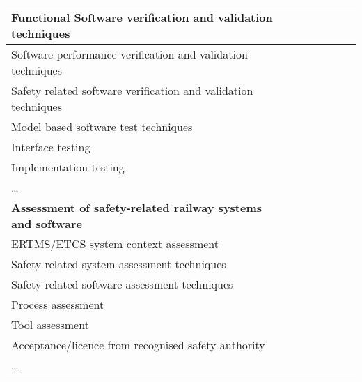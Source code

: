 \documentclass[a4paper, 11pt]{article}
\begin{document}
\begin{center}
\begin{longtable}{|r|r|r|r|r|r|r|r|}
    \multicolumn{1}{|l|}{Functional Software verification and validation techniques} & \multicolumn{1}{l|}{} &       &       &       &       &       &  \bigstrut[b]\\
    \hline
    \multicolumn{1}{|l|}{Software performance verification and validation techniques} & \multicolumn{1}{l|}{} &       &       &       &       &       &  \bigstrut\\
    \hline
    \multicolumn{1}{|l|}{Safety related software verification and validation techniques} & \multicolumn{1}{l|}{} &       &       &       &       &       &  \bigstrut\\
    \hline
    \multicolumn{1}{|l|}{Model based software test techniques } & \multicolumn{1}{l|}{} &       &       &       &       &       &  \bigstrut\\
    \hline
    \multicolumn{1}{|l|}{Interface testing} & \multicolumn{1}{l|}{} &       &       &       &       &       &  \bigstrut\\
    \hline
    \multicolumn{1}{|l|}{Implementation testing} & \multicolumn{1}{l|}{} &       &       &       &       &       &  \bigstrut\\
    \hline
    \multicolumn{1}{|l|}{…} & \multicolumn{1}{l|}{} &       &       &       &       &       &  \bigstrut[t]\\
    \multicolumn{1}{|l|}{\textbf{Assessment of safety-related railway systems and software}} & \multicolumn{1}{l|}{\textbf{}} &       &       &       &       &       &  \\
    \multicolumn{1}{|l|}{ERTMS/ETCS system context assessment} & \multicolumn{1}{l|}{} &       &       &       &       &       &  \bigstrut[b]\\
    \hline
    \multicolumn{1}{|l|}{Safety related system assessment techniques} & \multicolumn{1}{l|}{} &       &       &       &       &       &  \bigstrut\\
    \hline
    \multicolumn{1}{|l|}{Safety related software assessment techniques} & \multicolumn{1}{l|}{} &       &       &       &       &       &  \bigstrut\\
    \hline
    \multicolumn{1}{|l|}{Process assessment} & \multicolumn{1}{l|}{} &       &       &       &       &       &  \bigstrut\\
    \hline
    \multicolumn{1}{|l|}{Tool assessment} & \multicolumn{1}{l|}{} &       &       &       &       &       &  \bigstrut\\
    \hline
    \multicolumn{1}{|l|}{Acceptance/licence from recognised safety authority} & \multicolumn{1}{l|}{} &       &       &       &       &       &  \bigstrut\\
    \hline
    \multicolumn{1}{|l|}{…} & \multicolumn{1}{l|}{} &       &       &       &       &       &  \bigstrut\\
    \hline
 
    \end{longtable}%




\end{center}
\end{document}
